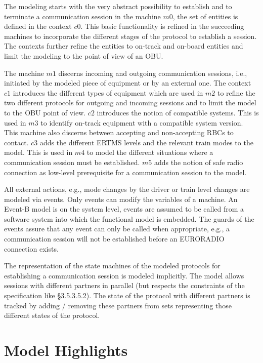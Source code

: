 \documentclass[10pt,a4paper]{article}
\begin{document}
The modeling starts with the very abstract possibility to establish and to
terminate a communication session in the machine $m0$, the set of entities is
defined in the context $c0$. This basic functionality is refined in the
succeeding machines to incorporate the different stages of the protocol to
establish a session. The contexts further refine the entities to on-track and
on-board entities and limit the modeling to the point of view of an OBU.

The machine $m1$ discerns incoming and outgoing communication sessions, i.e.,
initiated by the modeled piece of equipment or by an external one. The context
$c1$ introduces the different types of equipment which are used in $m2$ to
refine the two different protocols for outgoing and incoming sessions and to
limit the model to the OBU point of view. $c2$ introduces the notion of
compatible systems. This is used in $m3$ to identify on-track equipment with a
compatible system version. This machine also discerns between accepting and
non-accepting RBCs to contact. $c3$ adds the different ERTMS levels and the
relevant train modes to the model. This is used in $m4$ to model the different
situations where a communication session must be established. $m5$ adds the
notion of safe radio connection as low-level prerequisite for a communication
session to the model.

All external actions, e.g., mode changes by the driver or train level changes
are modeled via events. Only events can modify the variables of a machine. An
Event-B model is on the system level, events are assumed to be called from a
software system into which the functional model is embedded. The guards of the
events assure that any event can only be called when appropriate, e.g., a
communication session will not be established before an EURORADIO connection
exists.

The representation of the state machines of the modeled protocols for
establishing a communication session is modeled implicitly. The model allows
sessions with different partners in parallel (but respects the constraints of
the specification like §3.5.3.5.2). The state of the protocol with different
partners is tracked by adding / removing these partners from sets representing
those different states of the protocol.

\section{Model Highlights}
\label{sec:model-highlights}
\end{document}
